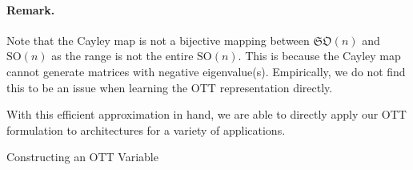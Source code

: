 \paragraph{Remark.} Note that the Cayley map is not a bijective mapping between $\mathfrak{SO}(n)$ and $\text{SO}(n)$ as the range is not the entire $\text{SO}(n)$. This is because the Cayley map cannot generate matrices with negative eigenvalue(s). Empirically, we do not find this to be an issue when learning the OTT representation directly.

With this efficient approximation in hand, we are able to directly apply our OTT formulation to architectures for a variety of applications.
\begin{algorithm}
	\caption{ \label{alg:ott-core} Constructing an OTT Variable}
	\SetAlgoLined
	\DontPrintSemicolon
\end{algorithm}